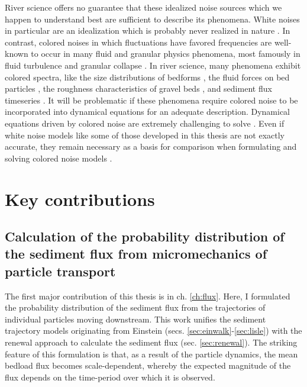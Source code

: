 River science offers no guarantee that these idealized noise sources which we happen to understand best are sufficient to describe its phenomena.
White noises in particular are an idealization which is probably never realized in nature \citep{Gardiner1983,Kubo1978}.
In contrast, colored noises in which fluctuations have favored frequencies are well-known to occur in many fluid and granular physics phenomena, most famously in fluid turbulence \citep{Kolmogorov1941,Nikora2000} and granular collapse \citep{Bak1987,Jensen1998}.
In river science, many phenomena exhibit colored spectra, like the size distributions of bedforms \citep{Nikora1997,Guala2014}, the fluid forces on bed particles \citep{Dwivedi2011, Amir2014}, the roughness characteristics of gravel beds \citep{Aberle2006,Singh2012}, and sediment flux timeseries \citep{Dhont2018,Chartrand2021}.
It will be problematic if these phenomena require colored noise to be incorporated into dynamical equations for an adequate description.
Dynamical equations driven by colored noise are extremely challenging to solve \citep{Hanggi1978,Luczka2005,Hanggi2007}.
Even if white noise models like some of those developed in this thesis are not exactly accurate, they remain necessary as a basis for comparison when formulating and solving colored noise models \citep{Fox1986,Moss1989}.

\section{Key contributions}

\subsection{Calculation of the probability distribution of the sediment flux from micromechanics of particle transport}

The first major contribution of this thesis is in ch. \ref{ch:flux}. Here, I formulated the probability distribution of the sediment flux from the trajectories of individual particles moving downstream. This work unifies the sediment trajectory models originating from Einstein (secs. \ref{sec:einwalk}-\ref{sec:lisle}) with the renewal approach to calculate the sediment flux (sec. \ref{sec:renewal}).
The striking feature of this formulation is that, as a result of the particle dynamics, the mean bedload flux becomes scale-dependent, whereby the expected magnitude of the flux depends on the time-period over which it is observed.

